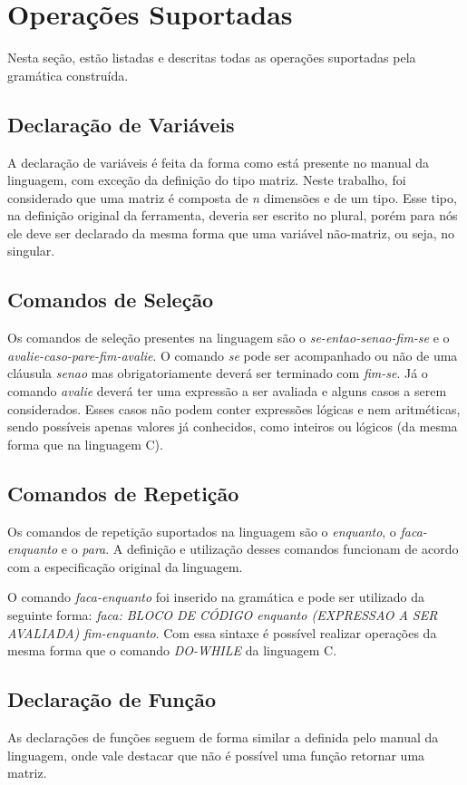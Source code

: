 \documentclass[
12pt,				%
a4paper,			%
english,			%
french,				%
spanish,			%
brazil,				%
article
]{abntex2}
\begin{document}
\section{Operações Suportadas}
Nesta seção, estão listadas e descritas todas as operações suportadas pela gramática construída.
\subsection{Declaração de Variáveis}
A declaração de variáveis é feita da forma como está presente no manual da linguagem, com exceção da definição do tipo matriz. Neste trabalho, foi considerado que uma matriz é composta de \textit{n} dimensões e de um tipo. Esse tipo, na definição original da ferramenta, deveria ser escrito no plural, porém para nós ele deve ser declarado da mesma forma que uma variável não-matriz, ou seja, no singular.


\subsection{Comandos de Seleção}
Os comandos de seleção presentes na linguagem são o \textit{se-entao-senao-fim-se} e o \textit{avalie-caso-pare-fim-avalie}.
O comando \textit{se} pode ser acompanhado ou não de uma cláusula \textit{senao} mas obrigatoriamente deverá ser terminado com \textit{fim-se}. Já o comando \textit{avalie} deverá ter uma expressão a ser avaliada e alguns casos a serem considerados. Esses casos não podem conter expressões lógicas e nem aritméticas, sendo possíveis apenas valores já conhecidos, como inteiros ou lógicos (da mesma forma que na linguagem C).

\subsection{Comandos de Repetição}
Os comandos de repetição suportados na linguagem são o \textit{enquanto}, o \textit{faca-enquanto} e o \textit{para}. A definição e utilização desses comandos funcionam de acordo com a especificação original da linguagem.

O comando \textit{faca-enquanto} foi inserido na gramática e pode ser utilizado da seguinte forma:
\textit{faca: BLOCO DE CÓDIGO enquanto (EXPRESSAO A SER AVALIADA) fim-enquanto}. Com essa sintaxe é possível realizar operações da mesma forma que o comando \textit{DO-WHILE} da linguagem C. 

\subsection{Declaração de Função}
As declarações de funções seguem de forma similar a definida pelo manual da linguagem, onde vale destacar que não é possível uma função retornar uma matriz.
\end{document}
